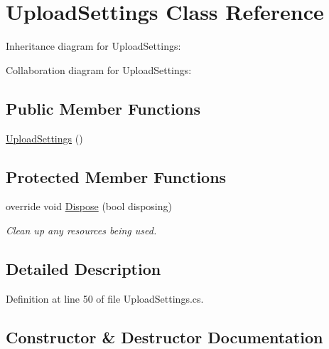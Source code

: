\hypertarget{class_m_p_f_s21_1_1_upload_settings}{}\section{Upload\+Settings Class Reference}
\label{class_m_p_f_s21_1_1_upload_settings}


Inheritance diagram for Upload\+Settings\+:


Collaboration diagram for Upload\+Settings\+:
\subsection*{Public Member Functions}
\begin{DoxyCompactItemize}
\item 
\hyperlink{class_m_p_f_s21_1_1_upload_settings_ace2e382eeef0c9c4be0879756e026d26}{Upload\+Settings} ()
\end{DoxyCompactItemize}
\subsection*{Protected Member Functions}
\begin{DoxyCompactItemize}
\item 
override void \hyperlink{class_m_p_f_s21_1_1_upload_settings_a849c3c7f8d08104f0cdb46bee9fe6389}{Dispose} (bool disposing)
\begin{DoxyCompactList}\small\item\em Clean up any resources being used. \end{DoxyCompactList}\end{DoxyCompactItemize}


\subsection{Detailed Description}


Definition at line 50 of file Upload\+Settings.\+cs.



\subsection{Constructor \& Destructor Documentation}
\hypertarget{class_m_p_f_s21_1_1_upload_settings_ace2e382eeef0c9c4be0879756e026d26}{}
